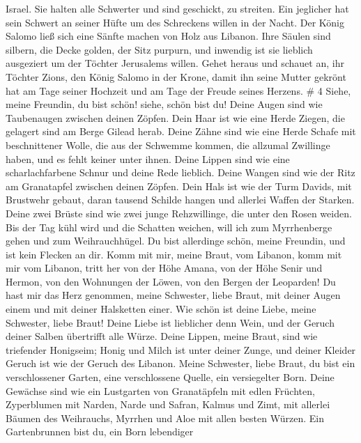 Israel.  Sie halten alle Schwerter und sind geschickt, zu
streiten. Ein jeglicher hat sein Schwert an seiner Hüfte um des
Schreckens willen in der Nacht.  Der König Salomo ließ sich
eine Sänfte machen von Holz aus Libanon.  Ihre Säulen sind
silbern, die Decke golden, der Sitz purpurn, und inwendig ist sie
lieblich ausgeziert um der Töchter Jerusalems willen. 
Gehet heraus und schauet an, ihr Töchter Zions, den König Salomo in der
Krone, damit ihn seine Mutter gekrönt hat am Tage seiner Hochzeit und am
Tage der Freude seines Herzens. \# 4  Siehe, meine Freundin,
du bist schön! siehe, schön bist du! Deine Augen sind wie Taubenaugen
zwischen deinen Zöpfen. Dein Haar ist wie eine Herde Ziegen, die
gelagert sind am Berge Gilead herab.  Deine Zähne sind wie
eine Herde Schafe mit beschnittener Wolle, die aus der Schwemme kommen,
die allzumal Zwillinge haben, und es fehlt keiner unter ihnen.
 Deine Lippen sind wie eine scharlachfarbene Schnur und
deine Rede lieblich. Deine Wangen sind wie der Ritz am Granatapfel
zwischen deinen Zöpfen.  Dein Hals ist wie der Turm Davids,
mit Brustwehr gebaut, daran tausend Schilde hangen und allerlei Waffen
der Starken.  Deine zwei Brüste sind wie zwei junge
Rehzwillinge, die unter den Rosen weiden.  Bis der Tag kühl
wird und die Schatten weichen, will ich zum Myrrhenberge gehen und zum
Weihrauchhügel.  Du bist allerdinge schön, meine Freundin,
und ist kein Flecken an dir.  Komm mit mir, meine Braut, vom
Libanon, komm mit mir vom Libanon, tritt her von der Höhe Amana, von der
Höhe Senir und Hermon, von den Wohnungen der Löwen, von den Bergen der
Leoparden!  Du hast mir das Herz genommen, meine Schwester,
liebe Braut, mit deiner Augen einem und mit deiner Halsketten einer.
 Wie schön ist deine Liebe, meine Schwester, liebe Braut!
Deine Liebe ist lieblicher denn Wein, und der Geruch deiner Salben
übertrifft alle Würze.  Deine Lippen, meine Braut, sind wie
triefender Honigseim; Honig und Milch ist unter deiner Zunge, und deiner
Kleider Geruch ist wie der Geruch des Libanon.  Meine
Schwester, liebe Braut, du bist ein verschlossener Garten, eine
verschlossene Quelle, ein versiegelter Born.  Deine
Gewächse sind wie ein Lustgarten von Granatäpfeln mit edlen Früchten,
Zyperblumen mit Narden,  Narde und Safran, Kalmus und Zimt,
mit allerlei Bäumen des Weihrauchs, Myrrhen und Aloe mit allen besten
Würzen.  Ein Gartenbrunnen bist du, ein Born lebendiger
